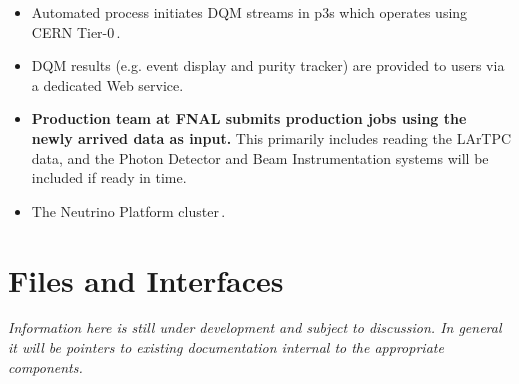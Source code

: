 \documentclass[pdftex,12pt,letter]{article}
\begin{document}
\begin{itemize}
\item Automated process initiates DQM streams in p3s which operates using
CERN Tier-0\,\cite{lxbatch}.

\item DQM results (e.g. event display and purity tracker) are provided to users via a dedicated Web service.

\item \textbf{Production team at FNAL submits production jobs using the newly arrived data as input.}
This primarily includes reading the LArTPC data, and the Photon Detector and Beam Instrumentation
systems will be included if ready in time.

\item The Neutrino Platform cluster\,\cite{neut}.

\end{itemize}



\clearpage

\appendix
\section{Files and Interfaces}
\emph{Information here is still under development and subject to discussion. In general it will be pointers to existing documentation  internal to the appropriate components. }
\\ 

\end{document}
